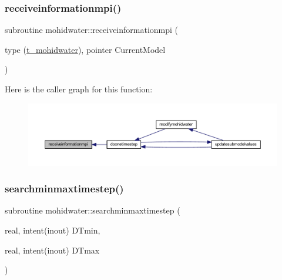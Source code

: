 \subsubsection{\texorpdfstring{receiveinformationmpi()}{receiveinformationmpi()}}
{\footnotesize\ttfamily subroutine mohidwater\+::receiveinformationmpi (\begin{DoxyParamCaption}\item[{type (\mbox{\hyperlink{structt__mohidwater}{t\+\_\+mohidwater}}), pointer}]{Current\+Model }\end{DoxyParamCaption})}

Here is the caller graph for this function\+:\nopagebreak
\begin{figure}[H]
\begin{center}
\leavevmode
\includegraphics[width=350pt]{_main_8_f90_a27516f33f4d1cea85cbc73fd9de518e6_icgraph}
\end{center}
\end{figure}
\mbox{\label{_main_8_f90_a21af06ec88c487727156f8a6158380c6}} 
\subsubsection{\texorpdfstring{searchminmaxtimestep()}{searchminmaxtimestep()}}
{\footnotesize\ttfamily subroutine mohidwater\+::searchminmaxtimestep (\begin{DoxyParamCaption}\item[{real, intent(inout)}]{D\+Tmin,  }\item[{real, intent(inout)}]{D\+Tmax }\end{DoxyParamCaption})}


